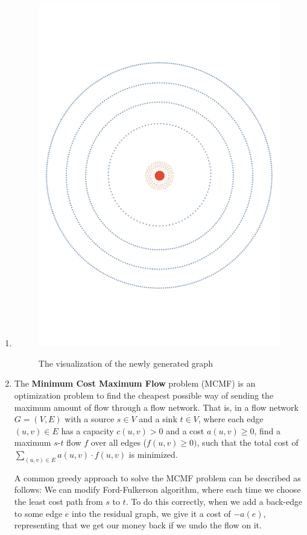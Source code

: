 \documentclass[12pt,a4paper]{article}
\makeatletter
\newtheorem*{solution}{Solution}
\theoremstyle{definition}
\renewenvironment{solution}[1][Solution] {\par\pushQED{\qed}\normalfont\topsep6\p@\@plus6\p@\relax\trivlist\item[\hskip\labelsep\bfseries#1\@addpunct{.}]\ignorespaces}{\popQED\endtrivlist\@endpefalse} \makeatother
\makeatother
\begin{document}
\begin{enumerate}
\begin{solution}
\begin{enumerate}
\begin{figure}[htbp]
  \includegraphics[width=5in]{pics/prob2-2.pdf}\\
  \caption{The visualization of the newly generated graph}\label{fig2-2}
\end{figure}
    \end{enumerate}
    \end{solution}

    \clearpage
	\item The \textbf{Minimum Cost Maximum Flow} problem (MCMF) is an optimization problem to find the cheapest possible way of sending the maximum amount of flow through a flow network. That is, in a flow network $G = (V, E)$ with a source $s\in V$ and a sink $t\in V$, where each edge $(u, v)\in E$ has a capacity $c(u,v) > 0$ and a cost $a(u,v) \ge 0$, find a maximum $s\text{-}t$ flow $f$ over all edges ($f(u, v) \ge 0)$, such that the total cost of $\sum_{(u, v) \in E} a(u, v) \cdot f(u, v)$ is minimized.

A common greedy approach to solve the MCMF problem can be described as follows: We can modify Ford-Fulkerson algorithm, where each time we choose the least cost path from $s$ to $t$. To do this correctly, when we add a back-edge to some edge $e$ into the residual graph, we give it a cost of $-a(e)$, representing that we get our money back if we undo the flow on it.


\end{enumerate}
\end{document}
